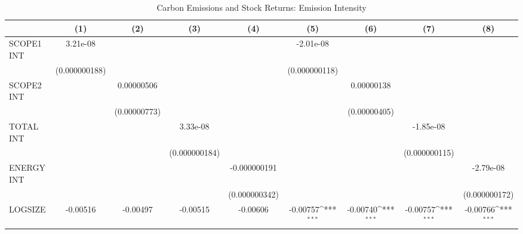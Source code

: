 \begin{table}[htbp]\centering
\def\sym#1{\ifmmode^{#1}\else\(^{#1}\)\fi}
\caption{Carbon Emissions and Stock Returns: Emission Intensity}
\begin{tabular}{l*{8}{c}}
\hline\hline
                    &\multicolumn{1}{c}{(1)}         &\multicolumn{1}{c}{(2)}         &\multicolumn{1}{c}{(3)}         &\multicolumn{1}{c}{(4)}         &\multicolumn{1}{c}{(5)}         &\multicolumn{1}{c}{(6)}         &\multicolumn{1}{c}{(7)}         &\multicolumn{1}{c}{(8)}         \\
\hline
SCOPE1 INT          &    3.21e-08         &                     &                     &                     &   -2.01e-08         &                     &                     &                     \\
                    &(0.000000188)         &                     &                     &                     &(0.000000118)         &                     &                     &                     \\
SCOPE2 INT          &                     &  0.00000506         &                     &                     &                     &  0.00000138         &                     &                     \\
                    &                     &(0.00000773)         &                     &                     &                     &(0.00000405)         &                     &                     \\
TOTAL INT           &                     &                     &    3.33e-08         &                     &                     &                     &   -1.85e-08         &                     \\
                    &                     &                     &(0.000000184)         &                     &                     &                     &(0.000000115)         &                     \\
ENERGY INT          &                     &                     &                     &-0.000000191         &                     &                     &                     &   -2.79e-08         \\
                    &                     &                     &                     &(0.000000342)         &                     &                     &                     &(0.000000172)         \\
LOGSIZE             &    -0.00516         &    -0.00497         &    -0.00515         &    -0.00606         &    -0.00757\sym{***}&    -0.00740\sym{***}&    -0.00757\sym{***}&    -0.00766\sym{***}\\

\end{tabular}
\end{table}
